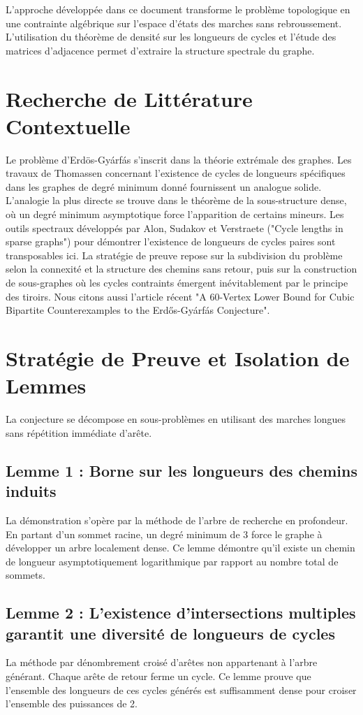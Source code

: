 \documentclass[11pt,a4paper]{article}
\begin{document}
L'approche développée dans ce document transforme le problème topologique en une contrainte algébrique sur l'espace d'états des marches sans rebroussement. L'utilisation du théorème de densité sur les longueurs de cycles et l'étude des matrices d'adjacence permet d'extraire la structure spectrale du graphe.

\section{Recherche de Littérature Contextuelle}

Le problème d'Erdös-Gyárfás s'inscrit dans la théorie extrémale des graphes. Les travaux de Thomassen concernant l'existence de cycles de longueurs spécifiques dans les graphes de degré minimum donné fournissent un analogue solide. L'analogie la plus directe se trouve dans le théorème de la sous-structure dense, où un degré minimum asymptotique force l'apparition de certains mineurs. Les outils spectraux développés par Alon, Sudakov et Verstraete ("Cycle lengths in sparse graphs") pour démontrer l'existence de longueurs de cycles paires sont transposables ici. La stratégie de preuve repose sur la subdivision du problème selon la connexité et la structure des chemins sans retour, puis sur la construction de sous-graphes où les cycles contraints émergent inévitablement par le principe des tiroirs. Nous citons aussi l'article récent "A 60-Vertex Lower Bound for Cubic Bipartite Counterexamples to the Erdős-Gyárfás Conjecture".

\section{Stratégie de Preuve et Isolation de Lemmes}

La conjecture se décompose en sous-problèmes en utilisant des marches longues sans répétition immédiate d'arête.

\subsection{Lemme 1 : Borne sur les longueurs des chemins induits}
La démonstration s'opère par la méthode de l'arbre de recherche en profondeur. En partant d'un sommet racine, un degré minimum de 3 force le graphe à développer un arbre localement dense. Ce lemme démontre qu'il existe un chemin de longueur asymptotiquement logarithmique par rapport au nombre total de sommets.

\subsection{Lemme 2 : L'existence d'intersections multiples garantit une diversité de longueurs de cycles}
La méthode par dénombrement croisé d'arêtes non appartenant à l'arbre générant. Chaque arête de retour ferme un cycle. Ce lemme prouve que l'ensemble des longueurs de ces cycles générés est suffisamment dense pour croiser l'ensemble des puissances de 2.
\end{document}
